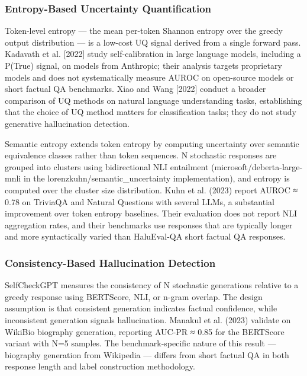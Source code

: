 
\subsubsection{Entropy-Based Uncertainty Quantification}

Token-level entropy — the mean per-token Shannon entropy over the greedy output distribution — is a low-cost UQ signal derived from a single forward pass. Kadavath et al. [2022] study self-calibration in large language models, including a P(True) signal, on models from Anthropic; their analysis targets proprietary models and does not systematically measure AUROC on open-source models or short factual QA benchmarks. Xiao and Wang [2022] conduct a broader comparison of UQ methods on natural language understanding tasks, establishing that the choice of UQ method matters for classification tasks; they do not study generative hallucination detection.

Semantic entropy \citep{Kuhnetal2023} extends token entropy by computing uncertainty over semantic equivalence classes rather than token sequences. N stochastic responses are grouped into clusters using bidirectional NLI entailment (microsoft/deberta-large-mnli in the lorenzkuhn/semantic_uncertainty implementation), and entropy is computed over the cluster size distribution. Kuhn et al. (2023) report AUROC ≈ 0.78 on TriviaQA and Natural Questions with several LLMs, a substantial improvement over token entropy baselines. Their evaluation does not report NLI aggregation rates, and their benchmarks use responses that are typically longer and more syntactically varied than HaluEval-QA short factual QA responses.

\subsubsection{Consistency-Based Hallucination Detection}

SelfCheckGPT \citep{Manakuletal2023} measures the consistency of N stochastic generations relative to a greedy response using BERTScore, NLI, or n-gram overlap. The design assumption is that consistent generation indicates factual confidence, while inconsistent generation signals hallucination. Manakul et al. (2023) validate on WikiBio biography generation, reporting AUC-PR ≈ 0.85 for the BERTScore variant with N=5 samples. The benchmark-specific nature of this result — biography generation from Wikipedia — differs from short factual QA in both response length and label construction methodology.

